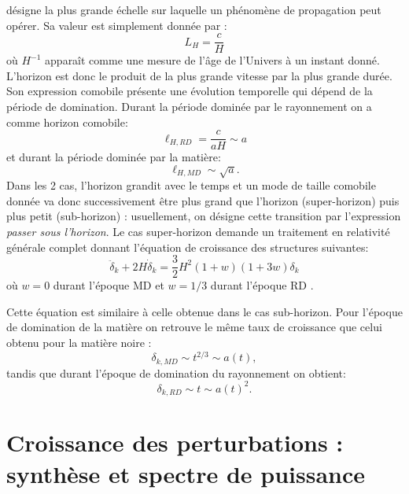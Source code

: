  désigne la plus grande échelle sur laquelle un phénomène de propagation peut opérer. Sa valeur est simplement donnée par :
\begin{equation}
L_H=\frac{c}{H}
\end{equation}
où $H^{-1}$ apparaît comme une mesure de l'âge de l'Univers à un instant donné. L'horizon est donc le produit de la plus grande vitesse par la plus grande durée. Son expression comobile présente une évolution temporelle qui dépend de la période de domination. Durant la période dominée par le rayonnement on a comme horizon comobile:
\begin{equation}
\ell_{H,RD}=\frac{c}{aH}\sim a
\end{equation} 
et durant la période dominée par la matière:
\begin{equation}
\ell_{H,MD}\sim\sqrt{a}.
\end{equation}
Dans les 2 cas, l'horizon grandit avec le temps et un mode de taille comobile donnée va donc successivement être plus grand que l'horizon (super-horizon) puis plus petit (sub-horizon) : usuellement, on désigne cette transition par l'expression \textit{passer sous l'horizon}. Le cas super-horizon demande un traitement en relativité générale complet donnant l'équation de croissance des structures suivantes:
\begin{equation}
\ddot \delta_k + 2H \dot \delta_k = \frac{3}{2}H^2(1+w)(1+3w)\delta_k
\end{equation}
où $w=0$ durant l'époque MD et $w=1/3$ durant l'époque RD . 

Cette équation est similaire à celle obtenue dans le cas sub-horizon. Pour l'époque de domination de la matière on retrouve le même taux de croissance que celui obtenu pour la matière noire :
\begin{equation}
\delta_{k,MD}\sim t^{2/3}\sim a(t),
\end{equation}
tandis que durant l'époque de domination du rayonnement on obtient:
\begin{equation}
\delta_{k,RD}\sim t \sim a(t)^2.
\end{equation}


\section{Croissance des perturbations : synthèse et spectre de puissance}

